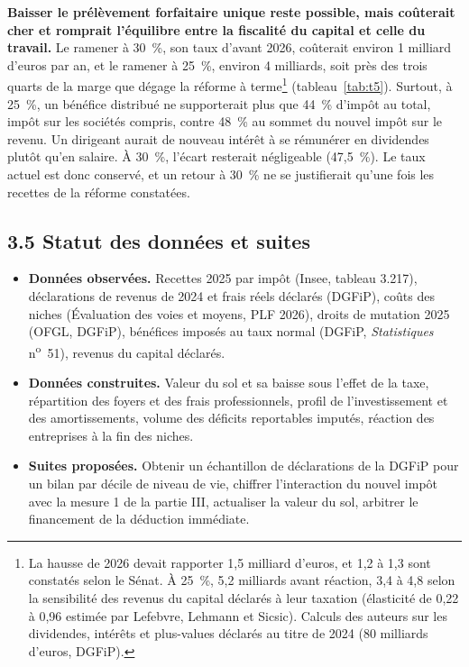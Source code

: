 \documentclass[10pt,a4paper]{article}
\begin{document}
\textbf{Baisser le prélèvement forfaitaire unique reste possible, mais coûterait cher et romprait l'équilibre entre la fiscalité du capital et celle du travail.} Le ramener à 30~\%, son taux d'avant 2026, coûterait environ 1 milliard d'euros par an, et le ramener à 25~\%, environ 4 milliards, soit près des trois quarts de la marge que dégage la réforme à terme\footnote{La hausse de 2026 devait rapporter 1,5 milliard d'euros, et 1,2 à 1,3 sont constatés selon le Sénat. À 25~\%, 5,2 milliards avant réaction, 3,4 à 4,8 selon la sensibilité des revenus du capital déclarés à leur taxation (élasticité de 0,22 à 0,96 estimée par Lefebvre, Lehmann et Sicsic). Calculs des auteurs sur les dividendes, intérêts et plus-values déclarés au titre de 2024 (80 milliards d'euros, DGFiP).} (tableau~\ref{tab:t5}). Surtout, à 25~\%, un bénéfice distribué ne supporterait plus que 44~\% d'impôt au total, impôt sur les sociétés compris, contre 48~\% au sommet du nouvel impôt sur le revenu. Un dirigeant aurait de nouveau intérêt à se rémunérer en dividendes plutôt qu'en salaire. À 30~\%, l'écart resterait négligeable (47,5~\%). Le taux actuel est donc conservé, et un retour à 30~\% ne se justifierait qu'une fois les recettes de la réforme constatées.



\subsection{3.5 Statut des données et suites}

\begin{itemize}[leftmargin=12pt,itemsep=1pt,topsep=1pt]
\item \textbf{Données observées.} Recettes 2025 par impôt (Insee, tableau 3.217), déclarations de revenus de 2024 et
frais réels déclarés (DGFiP), coûts des niches (Évaluation des voies et moyens, PLF 2026), droits de mutation 2025 (OFGL,
DGFiP), bénéfices imposés au taux normal (DGFiP, \emph{Statistiques} n\textsuperscript{o}~51), revenus du capital déclarés.
\item \textbf{Données construites.} Valeur du sol et sa baisse sous l'effet de la taxe, répartition des foyers et des
frais professionnels, profil de l'investissement et des amortissements, volume des déficits reportables imputés,
réaction des entreprises à la fin des niches.
\item \textbf{Suites proposées.} Obtenir un échantillon de déclarations de la DGFiP pour un bilan par décile de niveau de
vie, chiffrer l'interaction du nouvel impôt avec la mesure 1 de la partie III, actualiser la valeur du sol, arbitrer le
financement de la déduction immédiate.
\end{itemize}
\end{document}
